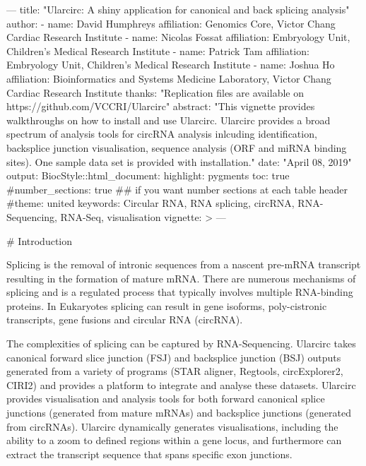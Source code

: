 ---
title: "Ularcirc: A shiny application for canonical and back splicing analysis"
author: 
  - name: David Humphreys
    affiliation: Genomics Core, Victor Chang Cardiac Research Institute
  - name: Nicolas Fossat
    affiliation: Embryology Unit, Children's Medical Research Institute
  - name: Patrick Tam
    affiliation: Embryology Unit, Children's Medical Research Institute
  - name: Joshua Ho
    affiliation: Bioinformatics and Systems Medicine Laboratory, Victor Chang Cardiac Research Institute
thanks: "Replication files are available on https://github.com/VCCRI/Ularcirc"
abstract: "This vignette provides walkthroughs on how to install and use Ularcirc. Ularcirc provides a broad spectrum of analysis tools for circRNA analysis inlcuding  identification, backsplice junction visualisation, sequence analysis (ORF and miRNA binding sites). One sample data set is provided with installation."
date: "April 08, 2019"
output: 
    BiocStyle::html_document:
    highlight: pygments
    toc: true
    #number_sections: true  ## if you want number sections at each table header
    #theme: united 
keywords: Circular RNA, RNA splicing, circRNA, RNA-Sequencing, RNA-Seq, visualisation
vignette: >
---






# Introduction

Splicing is the removal of intronic sequences from a nascent pre-mRNA transcript resulting in the formation of mature mRNA. There are numerous mechanisms of splicing and is a regulated process that typically involves multiple RNA-binding proteins. In Eukaryotes splicing can result in gene isoforms, poly-cistronic transcripts, gene fusions and circular RNA (circRNA).

 The complexities of splicing  can be captured by RNA-Sequencing. Ularcirc takes  canonical forward slice junction (FSJ) and backsplice junction (BSJ) outputs generated from a variety of programs (STAR aligner, Regtools, circExplorer2, CIRI2) and provides a platform to integrate and analyse these datasets. Ularcirc provides visualisation and analysis tools for both forward canonical splice junctions (generated from mature mRNAs) and backsplice junctions (generated from circRNAs). Ularcirc dynamically generates visualisations, including the ability to a zoom to defined regions within a gene locus, and furthermore can extract the transcript sequence that spans specific exon junctions.
 
